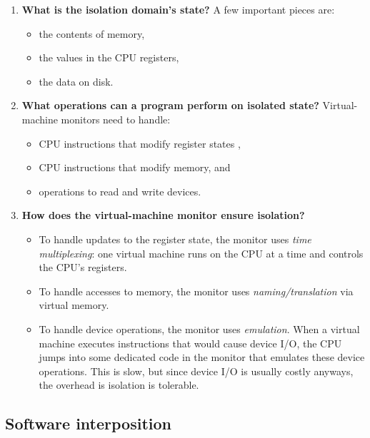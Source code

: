 \documentclass[
  letterpaper,
]{scrbook}
\providecommand{\tightlist}{%
  \setlength{\itemsep}{0pt}\setlength{\parskip}{0pt}}
\theoremstyle{definition}
\theoremstyle{plain}
\theoremstyle{plain}
\theoremstyle{remark}
\begin{document}
\begin{enumerate}
\def\labelenumi{\arabic{enumi}.}
\tightlist
\item
  \textbf{What is the isolation domain's state?} A few important pieces
  are:

  \begin{itemize}
  \tightlist
  \item
    the contents of memory,
  \item
    the values in the CPU registers,
  \item
    the data on disk.
  \end{itemize}
\item
  \textbf{What operations can a program perform on isolated state?}
  Virtual-machine monitors need to handle:

  \begin{itemize}
  \tightlist
  \item
    CPU instructions that modify register states ,
  \item
    CPU instructions that modify memory, and
  \item
    operations to read and write devices.
  \end{itemize}
\item
  \textbf{How does the virtual-machine monitor ensure isolation?}

  \begin{itemize}
  \tightlist
  \item
    To handle updates to the register state, the monitor uses \emph{time
    multiplexing}: one virtual machine runs on the CPU at a time and
    controls the CPU's registers.
  \item
    To handle accesses to memory, the monitor uses
    \emph{naming/translation} via virtual memory.
  \item
    To handle device operations, the monitor uses \emph{emulation}. When
    a virtual machine executes instructions that would cause device I/O,
    the CPU jumps into some dedicated code in the monitor that emulates
    these device operations. This is slow, but since device I/O is
    usually costly anyways, the overhead is isolation is tolerable.
  \end{itemize}
\end{enumerate}

\subsection{Software interposition}\label{software-interposition}
\end{document}
